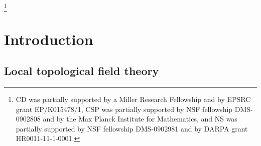 \documentclass{amsart}
\begin{document}
\thanks{CD was partially supported by a Miller Research Fellowship and by EPSRC grant EP/K015478/1, CSP was partially supported by NSF fellowship DMS-0902808 and by the Max Planck Institute for Mathematics, and NS was partially supported by NSF fellowship DMS-0902981 and by DARPA grant HR0011-11-1-0001.}

\vspace*{-25pt}

\maketitle	

\vspace*{-15pt}

\setcounter{tocdepth}{2}
\tableofcontents





\section{Introduction}

\subsection{Local topological field theory}
\end{document}
